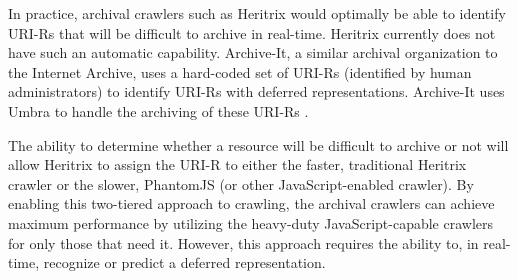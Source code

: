 \documentclass{ipres_proc_article-sp}
\begin{document}
In practice, archival crawlers such as Heritrix would optimally be able to identify URI-Rs that will be difficult to archive in real-time. Heritrix currently does not have such an automatic capability. Archive-It, a similar archival organization to the Internet Archive, uses a hard-coded set of URI-Rs (identified by human administrators) to identify URI-Rs with deferred representations. Archive-It uses Umbra to handle the archiving of these URI-Rs \cite{umbra}.

The ability to determine whether a resource will be difficult to archive or not will allow Heritrix to assign the URI-R to either the faster, traditional Heritrix crawler or the slower,  PhantomJS (or other JavaScript-enabled crawler). By enabling this two-tiered approach to crawling, the archival crawlers can achieve maximum performance by utilizing the heavy-duty JavaScript-capable crawlers for only those that need it. However, this approach requires the ability to, in real-time, recognize or predict a deferred representation.
\end{document}
